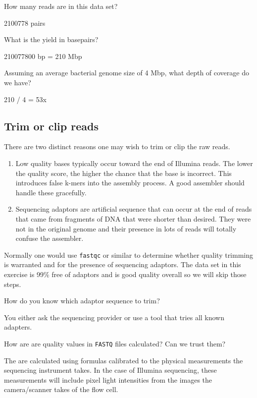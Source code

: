\begin{questions}
How many reads are in this data set? \\
\begin{answer}
2100778 pairs
\end{answer}
What is the yield in basepairs? \\
\begin{answer}
210077800 bp = 210 Mbp
\end{answer}
Assuming an average bacterial genome size of 4 Mbp, what depth of coverage do we have? \\
\begin{answer}
210 / 4 = 53x
\end{answer}
\end{questions}

\subsection{Trim or clip reads}

There are two distinct reasons one may wish to trim or clip the raw reads.
\begin{enumerate}
\item Low quality bases typically occur toward the end of Illumina reads.
The lower the quality score, the higher the chance that the base is incorrect.
This introduces false k-mers into the assembly process. A good assembler
should handle these gracefully.
\item Sequencing adaptors are artificial sequence that can occur at the end of
reads that came from fragments of DNA that were shorter than desired.
They were not in the original genome and their presence in lots of reads
will totally confuse the assembler.
\end{enumerate}

Normally one would use \texttt{fastqc} or similar to determine whether
quality trimming is warranted and for the presence of sequencing adaptors.
The data set in this exercise is 99\% free of adaptors and is good quality
overall so we will skip those steps.
\begin{questions}
How do you know which adaptor sequence to trim? \\
\begin{answer}
You either ask the sequencing provider or use a tool that tries all known adapters.
\end{answer}
How are are quality values in \texttt{FASTQ} files calculated? Can we trust them? \\
\begin{answer}
The are calculated using formulas calibrated to the physical measurements the
sequencing instrument takes. In the case of Illumina sequencing, these measurements
will include pixel light intensities from the images the camera/scanner takes
of the flow cell.
\end{answer}
\end{questions}

